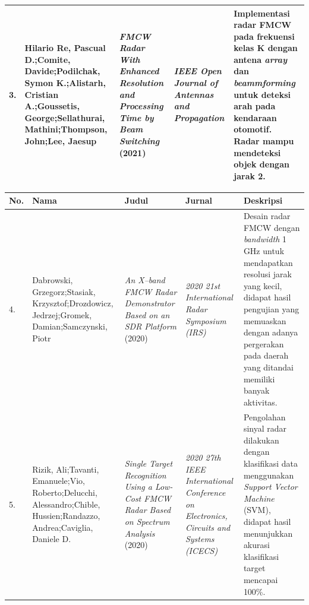 \begin{center}
\begin{longtable}{|p{0.5cm}|p{2cm}|p{3cm}|p{2.5cm}|p{4cm}|}
	3. & Hilario Re, Pascual D.;\newline Comite, Davide;\newline Podilchak, Symon K.;\newline Alistarh, Cristian A.;\newline Goussetis, George;\newline Sellathurai, Mathini;\newline Thompson, John;\newline Lee, Jaesup
	& \textit{FMCW Radar With Enhanced Resolution and Processing Time by Beam Switching} (2021)
	& \textit{IEEE Open Journal of Antennas and Propagation}
	& Implementasi radar FMCW pada frekuensi kelas K dengan antena \textit{array} dan \textit{beammforming} untuk deteksi arah pada kendaraan otomotif. Radar mampu mendeteksi objek dengan jarak 2\textdegree.
	\\ \hline
	\end{longtable}

	\vspace{5cm}

	\begin{longtable}{|p{0.5cm}|p{2cm}|p{3cm}|p{2.5cm}|p{4cm}|}
	\hline
	\textbf{No.} & \textbf{Nama} & \textbf{Judul} &\textbf{Jurnal} & \textbf{Deskripsi}\\
	\hline
	4.& Dabrowski, Grzegorz;\newline Stasiak, Krzysztof;\newline Drozdowicz, Jedrzej;\newline Gromek, Damian;\newline Samczynski, Piotr
	& \textit{An X–band FMCW Radar Demonstrator Based on an SDR Platform} (2020)
	& \textit{2020 21st International Radar Symposium (IRS)}
	& Desain radar FMCW dengan \textit{bandwidth} 1 GHz untuk mendapatkan resolusi jarak yang kecil, didapat hasil pengujian yang memuaskan dengan adanya pergerakan pada daerah yang ditandai memiliki banyak aktivitas. \\ \hline
	
	5.& Rizik, Ali;\newline Tavanti, Emanuele;\newline Vio, Roberto;\newline Delucchi, Alessandro;\newline Chible, Hussien;\newline Randazzo, Andrea;\newline Caviglia, Daniele D.
	& \textit{Single Target Recognition Using a Low-Cost FMCW Radar Based on Spectrum Analysis} (2020)
	& \textit{2020 27th IEEE International Conference on Electronics, Circuits and Systems (ICECS)}
	& Pengolahan sinyal radar dilakukan dengan klasifikasi data menggunakan \textit{Support Vector Machine} (SVM), didapat hasil menunjukkan akurasi klasifikasi target mencapai 100\%. 
	\\ \hline
	\end{longtable}


\end{center}

